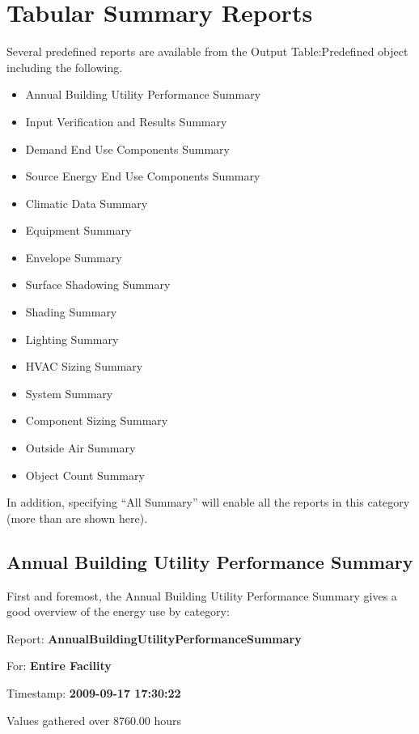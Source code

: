 \section{Tabular Summary Reports}\label{tabular-summary-reports}

Several predefined reports are available from the Output Table:Predefined object including the following.

\begin{itemize}
\item
  Annual Building Utility Performance Summary
\item
  Input Verification and Results Summary
\item
  Demand End Use Components Summary
\item
  Source Energy End Use Components Summary
\item
  Climatic Data Summary
\item
  Equipment Summary
\item
  Envelope Summary
\item
  Surface Shadowing Summary
\item
  Shading Summary
\item
  Lighting Summary
\item
  HVAC Sizing Summary
\item
  System Summary
\item
  Component Sizing Summary
\item
  Outside Air Summary
\item
  Object Count Summary
\end{itemize}

In addition, specifying ``All Summary'' will enable all the reports in this category (more than are shown here).

\subsection{Annual Building Utility Performance Summary}\label{annual-building-utility-performance-summary}

First and foremost, the Annual Building Utility Performance Summary gives a good overview of the energy use by category:

Report: \textbf{AnnualBuildingUtilityPerformanceSummary}

For: \textbf{Entire Facility}

Timestamp: \textbf{2009-09-17 17:30:22}

Values gathered over 8760.00 hours

